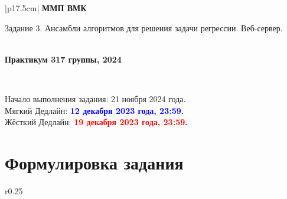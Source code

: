 \documentclass[10pt,fleqn]{article}
\begin{document}
\begin{center}
    \begin{tabular}{|p{17.5cm}|}
        \hline
        \textbf{ММП ВМК}\\
        \begin{center} \Large Задание 3. Ансамбли алгоритмов для решения задачи регрессии. Веб-сервер. \end{center}\\
        \textbf{Практикум 317 группы, 2024}\\
        \hline
    \end{tabular}
\end{center}

\

\begin{tabbing}
    Начало выполнения задания: 21 ноября 2024 года.\\
    Мягкий Дедлайн: \textcolor{blue}{\bf 12 декабря 2023 года, 23:59.} \\
    Жёсткий Дедлайн: \textcolor{red}{\bf 19 декабря 2023 года, 23:59.}
\end{tabbing}

\section*{Формулировка задания}

\begin{wrapfigure}[15]{r}{0.25\linewidth}
    \begin{center}
        \begin{minipage}[b]{0.8\textwidth}
            \renewcommand*\DTstylecomment{\color{blue}}
            \renewcommand*\DTstyle{\ttfamily\textcolor{red}}
        \end{minipage}
    \end{center}
    \caption{\label{fig:ensembles}Структура шаблона.}
\end{wrapfigure}
\end{document}
